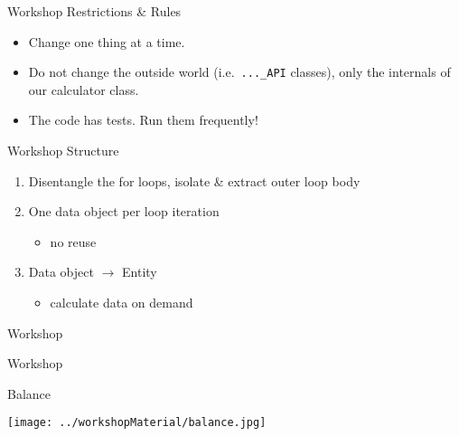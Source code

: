 \begin{frame}[fragile]{Workshop Restrictions \& Rules}

\begin{itemize}
\item Change one thing at a time.
\item Do not change the outside world (i.e.~\texttt{...\_API} classes), only the internals of our calculator class.
\item The code has tests. Run them frequently!
\end{itemize}

\end{frame}




\begin{frame}[fragile]{Workshop Structure}


\begin{enumerate}
\item Disentangle the for loops, isolate \& extract outer loop body
\item One data object per loop iteration
\begin{itemize}
\item no reuse
\end{itemize}
\item Data object $\rightarrow$ Entity
\begin{itemize}
\item calculate data on demand
\end{itemize}
\end{enumerate}

\end{frame}



\begin{frame}[fragile]{Workshop}

\begin{center}
{\huge Workshop}
\end{center}
\end{frame}

\begin{frame}[fragile]{Balance}
\begin{center}
\texttt{[image: ../workshopMaterial/balance.jpg]}
\end{center}
\end{frame}

